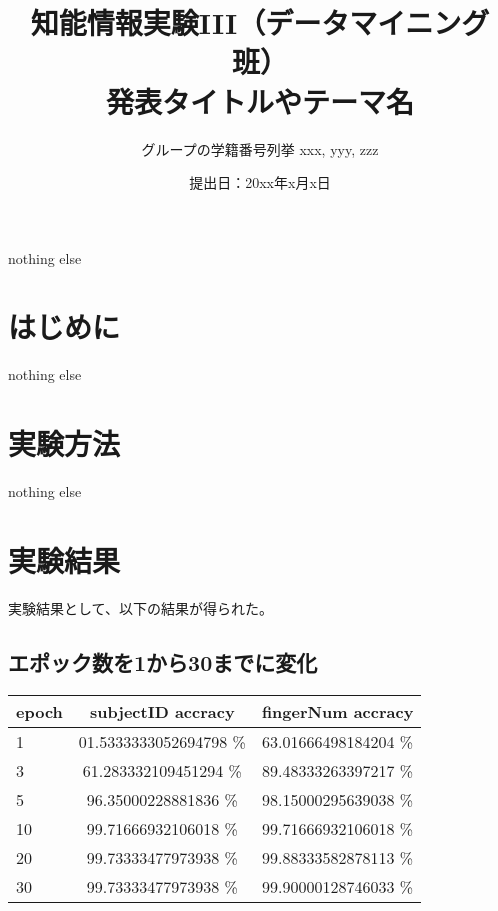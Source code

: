 \documentclass[a4paper, 11pt, titlepage]{jsarticle}
\title{知能情報実験III（データマイニング班）\\発表タイトルやテーマ名}
\author{グループの学籍番号列挙 xxx, yyy, zzz}
\date{提出日：20xx年x月x日}
\begin{document}
\maketitle
\tableofcontents
\clearpage

nothing else
\section{はじめに}
nothing else

\section{実験方法}
nothing else

\newpage
\section{実験結果}

実験結果として、以下の結果が得られた。%

\subsection{エポック数を1から30までに変化}
\begin{table}[htb]
  \begin{tabular}{|l|c|c|}
    \hline
    epoch & subjectID accracy & fingerNum accracy \\ \hline
    1 & 01.5333333052694798 \% & 63.01666498184204 \%  \\ \hline
    3 & 61.283332109451294 \% & 89.48333263397217 \% \\ \hline
    5 & 96.35000228881836 \% & 98.15000295639038 \%  \\ \hline
    10 & 99.71666932106018 \% & 99.71666932106018 \%  \\ \hline
    20 & 99.73333477973938 \% & 99.88333582878113 \%  \\ \hline
    30 & 99.73333477973938 \% & 99.90000128746033 \% \\ \hline
  \end{tabular}
\end{table}
\end{document}

